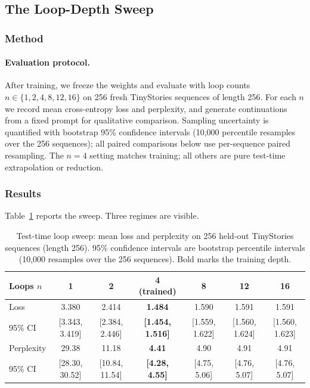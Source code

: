 \subsection{The Loop-Depth Sweep}
\label{sec:loopsweep}

\subsubsection{Method}

\paragraph{Evaluation protocol.}  After training, we freeze the weights
and evaluate with loop counts $n \in \{1, 2, 4, 8, 12, 16\}$ on 256
fresh TinyStories sequences of length 256. For each $n$ we record mean
cross-entropy loss and perplexity, and generate continuations from a
fixed prompt for qualitative comparison. Sampling uncertainty is
quantified with bootstrap 95\% confidence intervals (10,000 percentile
resamples over the 256 sequences); all paired comparisons below use
per-sequence paired resampling. The $n=4$ setting matches
training; all others are pure test-time extrapolation or reduction.

\subsubsection{Results}

Table~\ref{tab:sweep} reports the sweep. Three regimes are visible.

\begin{table}[t]
\centering
{\footnotesize\setlength{\tabcolsep}{6pt}
\begin{tabular}{lcccccc}
\toprule
Loops $n$ & 1 & 2 & 4 (trained) & 8 & 12 & 16 \\
\midrule
Loss & 3.380 & 2.414 & \textbf{1.484} & 1.590 & 1.591 & 1.591 \\
\phantom{Loss} 95\% CI & [3.343, 3.419] & [2.384, 2.446] & \textbf{[1.454, 1.516]} & [1.559, 1.622] & [1.560, 1.624] & [1.560, 1.623] \\
Perplexity & 29.38 & 11.18 & \textbf{4.41} & 4.90 & 4.91 & 4.91 \\
\phantom{Perplexity} 95\% CI & [28.30, 30.52] & [10.84, 11.54] & \textbf{[4.28, 4.55]} & [4.75, 5.06] & [4.76, 5.07] & [4.76, 5.07] \\
\bottomrule
\end{tabular}}
\caption{Test-time loop sweep: mean loss and perplexity on 256 held-out
TinyStories sequences (length 256). 95\% confidence intervals are
bootstrap percentile intervals (10,000 resamples over the 256 sequences).
Bold marks the training depth.}
\label{tab:sweep}
\end{table}

